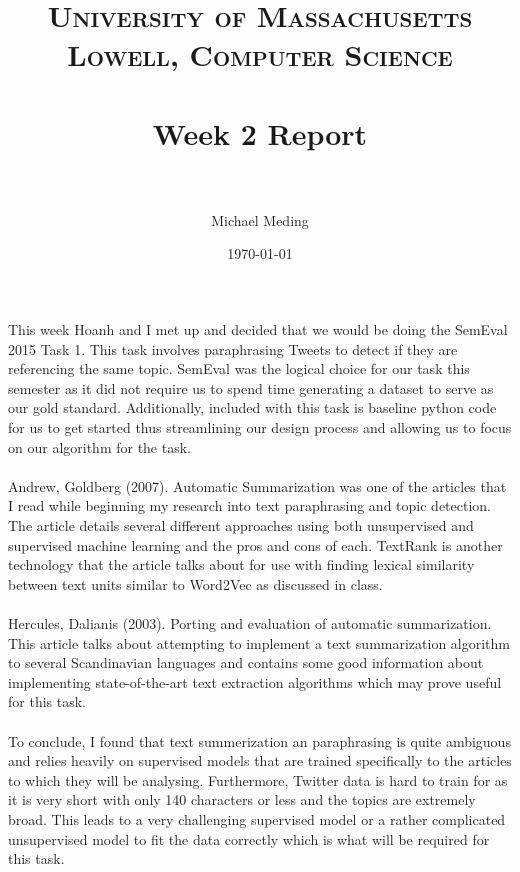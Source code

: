 \documentclass[paper=a4, fontsize=11pt]{scrartcl} %
\title{	
\normalfont \normalsize 
\textsc{University of Massachusetts Lowell, Computer Science} \\ [25pt] %
\horrule{0.5pt} \\[0.4cm] %
\huge Week 2 Report \\ %
\horrule{2pt} \\[0.5cm] %
}
\author{Michael Meding} %
\date{\normalsize\today} %
\numberwithin{equation}{section} %
\numberwithin{figure}{section} %
\numberwithin{table}{section} %
\begin{document}
\maketitle %


\paragraph{}
This week Hoanh and I met up and decided that we would be doing the SemEval 2015 Task 1. This task involves paraphrasing Tweets to detect if they are referencing the same topic. SemEval was the logical choice for our task this semester as it did not require us to spend time generating a dataset to serve as our gold standard. Additionally, included with this task is baseline python code for us to get started thus streamlining our design process and allowing us to focus on our algorithm for the task. 

\paragraph{}
Andrew, Goldberg (2007). Automatic Summarization was one of the articles that I read while beginning my research into text paraphrasing and topic detection. The article details several different approaches using both unsupervised and supervised machine learning and the pros and cons of each. TextRank is another technology that the article talks about for use with finding lexical similarity between text units similar to Word2Vec as discussed in class. 

\paragraph{}
Hercules, Dalianis (2003). Porting and evaluation of automatic summarization. This article talks about attempting to implement a text summarization algorithm to several Scandinavian languages and contains some good information about implementing state-of-the-art text extraction algorithms which may prove useful for this task.

\paragraph{}
To conclude, I found that text summerization an paraphrasing is quite ambiguous and relies heavily on supervised models that are trained specifically to the articles to which they will be analysing. Furthermore, Twitter data is hard to train for as it is very short with only 140 characters or less and the topics are extremely broad. This leads to a very challenging supervised model or a rather complicated unsupervised model to fit the data correctly which is what will be required for this task.
\end{document}
